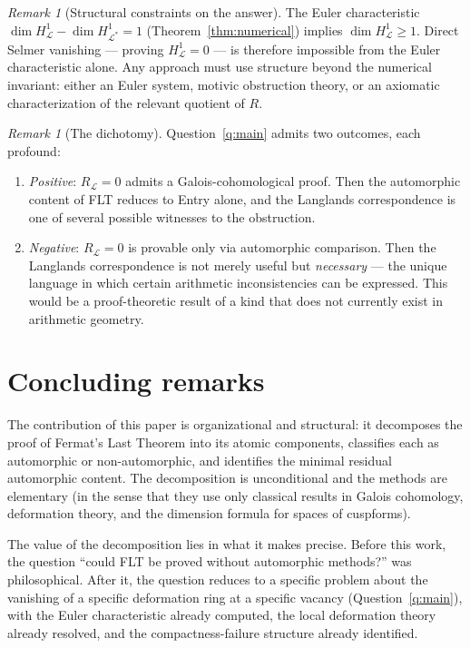 \documentclass[12pt]{amsart}
\theoremstyle{definition}
\theoremstyle{remark}
\newtheorem{remark}[theorem]{Remark}
\begin{document}
\begin{remark}[Structural constraints on the answer]
The Euler characteristic $\dim H^1_{\mathcal{L}} - \dim H^1_{\mathcal{L}^*} = 1$ (Theorem~\ref{thm:numerical}) implies $\dim H^1_{\mathcal{L}} \geq 1$. Direct Selmer vanishing --- proving $H^1_{\mathcal{L}} = 0$ --- is therefore impossible from the Euler characteristic alone. Any approach must use structure beyond the numerical invariant: either an Euler system, motivic obstruction theory, or an axiomatic characterization of the relevant quotient of $R$.
\end{remark}

\begin{remark}[The dichotomy]
Question~\ref{q:main} admits two outcomes, each profound:
\begin{enumerate}[label=(\Alph*)]
\item \emph{Positive}: $R_{\mathcal{L}} = 0$ admits a Galois-cohomological proof. Then the automorphic content of FLT reduces to Entry alone, and the Langlands correspondence is one of several possible witnesses to the obstruction.
\item \emph{Negative}: $R_{\mathcal{L}} = 0$ is provable only via automorphic comparison. Then the Langlands correspondence is not merely useful but \emph{necessary} --- the unique language in which certain arithmetic inconsistencies can be expressed. This would be a proof-theoretic result of a kind that does not currently exist in arithmetic geometry.
\end{enumerate}
\end{remark}

\section{Concluding remarks}
\label{sec:concluding}

The contribution of this paper is organizational and structural: it decomposes the proof of Fermat's Last Theorem into its atomic components, classifies each as automorphic or non-automorphic, and identifies the minimal residual automorphic content. The decomposition is unconditional and the methods are elementary (in the sense that they use only classical results in Galois cohomology, deformation theory, and the dimension formula for spaces of cuspforms).

The value of the decomposition lies in what it makes precise. Before this work, the question ``could FLT be proved without automorphic methods?'' was philosophical. After it, the question reduces to a specific problem about the vanishing of a specific deformation ring at a specific vacancy (Question~\ref{q:main}), with the Euler characteristic already computed, the local deformation theory already resolved, and the compactness-failure structure already identified.
\end{document}

